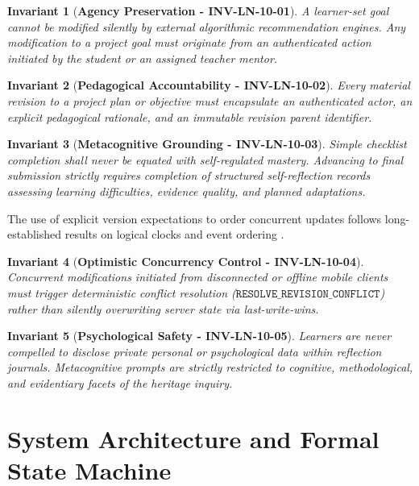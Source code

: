 \documentclass[11pt,a4paper]{article}
\newtheorem{invariant}{Invariant}
\begin{document}
\begin{invariant}[\textbf{Agency Preservation - INV-LN-10-01}]
A learner-set goal cannot be modified silently by external algorithmic recommendation engines. Any modification to a project goal must originate from an authenticated action initiated by the student or an assigned teacher mentor.
\end{invariant}

\begin{invariant}[\textbf{Pedagogical Accountability - INV-LN-10-02}]
Every material revision to a project plan or objective must encapsulate an authenticated actor, an explicit pedagogical rationale, and an immutable revision parent identifier.
\end{invariant}

\begin{invariant}[\textbf{Metacognitive Grounding - INV-LN-10-03}]
Simple checklist completion shall never be equated with self-regulated mastery. Advancing to final submission strictly requires completion of structured self-reflection records assessing learning difficulties, evidence quality, and planned adaptations.
\end{invariant}

The use of explicit version expectations to order concurrent updates follows long-established results on logical clocks and event ordering \cite{lamport1978time}.

\begin{invariant}[\textbf{Optimistic Concurrency Control - INV-LN-10-04}]
Concurrent modifications initiated from disconnected or offline mobile clients must trigger deterministic conflict resolution ($\mathtt{RESOLVE\_REVISION\_CONFLICT}$) rather than silently overwriting server state via last-write-wins.
\end{invariant}

\begin{invariant}[\textbf{Psychological Safety - INV-LN-10-05}]
Learners are never compelled to disclose private personal or psychological data within reflection journals. Metacognitive prompts are strictly restricted to cognitive, methodological, and evidentiary facets of the heritage inquiry.
\end{invariant}

\section{System Architecture and Formal State Machine}
\end{document}

